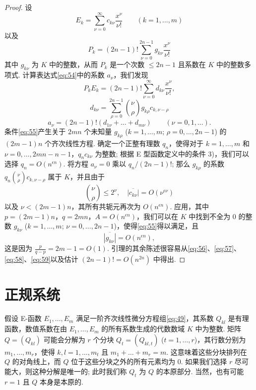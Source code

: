 \begin{proof}
设
\[E_{k} = \sum_{\nu=0}^{\infty} c_{k\nu} \frac{x^{\nu}}{\nu!} \qquad (k=1,\dots,m)\]
以及
\begin{equation}
P_{k} = (2n-1)! \sum_{\nu=0}^{2n-1} g_{k\nu} \frac{x^{\nu}}{\nu!} \tag{56}\label{eq:56}
\end{equation}
其中 $g_{k\nu}$ 为 $K$ 中的整数，从而 $P_k$ 是一个次数 $\le 2n-1$ 且系数在 $K$ 中的整数多项式. 计算表达式\eqref{eq:54}中的系数 $a_{\nu}$，我们发现
\begin{equation}
P_{k}E_{k} = (2n-1)! \sum_{\nu=0}^{\infty} d_{k\nu} \frac{x^{\nu}}{\nu!}, \tag{57}\label{eq:57}
\end{equation}
\[d_{k\nu} = \sum_{\rho=0}^{2n-1} \binom{\nu}{\rho} g_{k\rho} c_{k,\nu-\rho}\]
\begin{equation}
a_{\nu} = (2n-1)!(d_{1\nu} + \dots + d_{m\nu}) \qquad (\nu = 0, 1, \dots). \tag{58}\label{eq:58}
\end{equation}
条件\eqref{eq:55}产生关于 $2mn$ 个未知量 $g_{k\rho}$ ($k=1,\dots,m$; $\rho=0,\dots,2n-1$) 的 $(2m-1)n$ 个齐次线性方程. 确定一个正整有理数 $q_n$，使得对于 $k=1,\dots,m$ 和 $\nu=0,\dots,2mn-n-1$，$q_n c_{k\nu}$ 为整数; 根据 E 型函数定义中的条件 3)，我们可以选择 $q_n = O(n^{\epsilon n})$. 将方程 $a_{\nu}=0$ 乘以 $q_n/(2n-1)!$; 那么 $g_{k\rho}$ 的系数 $q_n \binom{\nu}{\rho} c_{k,\nu-\rho}$ 属于 $K$，并且由于
\begin{equation}
\binom{\nu}{\rho} \le 2^{\nu}, \quad \overline{|c_{k\nu}|} = O(\nu^{\epsilon \nu}) \tag{59}\label{eq:59}
\end{equation}
以及 $\nu < (2m-1)n$，其所有共轭元再次为 $O(n^{\epsilon n})$. 应用，其中 $p=(2m-1)n$，$q=2mn$，$A=O(n^{\epsilon n})$，我们可以在 $K$ 中找到不全为 0 的整数 $g_{k\nu}$ ($k=1,\dots,m$; $\nu=0,\dots,2n-1$)，使得\eqref{eq:55}得以满足，且
\[\overline{|g_{k\nu}|} = O(n^{\epsilon n}),\]
这是因为 $\frac{p}{q-p} = 2m-1 = O(1)$. 引理的其余陈述很容易从\eqref{eq:56}、\eqref{eq:57}、\eqref{eq:58}、\eqref{eq:59}以及估计 $(2n-1)! = O(n^{2n})$ 中得出.
\end{proof}

\section{正规系统}

假设 E-函数 $E_1, \dots, E_m$ 满足一阶齐次线性微分方程组\eqref{eq:49}，其系数 $Q_{kl}$ 是有理函数，数值系数在由 $E_1, \dots, E_m$ 的所有系数生成的代数数域 $K$ 中为整数. 矩阵 $Q=(Q_{kl})$ 可能会分解为 $r$ 个分块 $Q_t=(Q_{kl,t})$ ($t=1,\dots,r$)，其行数分别为 $m_1,\dots,m_r$，使得 $k,l=1,\dots,m_t$ 且 $m_1+\dots+m_r=m$. 这意味着这些分块排列在 $Q$ 的对角线上，而 $Q$ 位于这些分块之外的所有元素均为 0. 如果我们选择 $r$ 尽可能大，则这种分解是唯一的; 此时我们称 $Q_t$ 为 $Q$ 的本原部分. 当然，也有可能 $r=1$ 且 $Q$ 本身是本原的.

